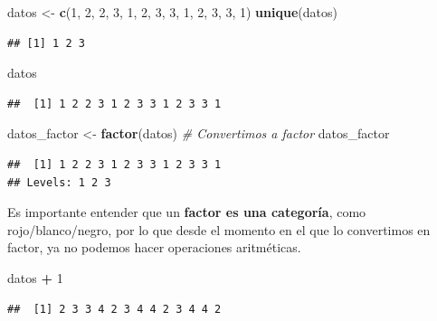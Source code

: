 \documentclass[11pt,]{book}
\newenvironment{Shaded}{\begin{snugshade}}{\end{snugshade}}
\newcommand{\CommentTok}[1]{\textcolor[rgb]{0.37,0.37,0.37}{\textit{#1}}}
\newcommand{\DecValTok}[1]{\textcolor[rgb]{0.06,0.06,0.06}{#1}}
\newcommand{\KeywordTok}[1]{\textcolor[rgb]{0.27,0.27,0.27}{\textbf{#1}}}
\newcommand{\NormalTok}[1]{#1}
\newcommand{\OperatorTok}[1]{\textcolor[rgb]{0.43,0.43,0.43}{\textbf{#1}}}
\newcommand{\StringTok}[1]{\textcolor[rgb]{0.5,0.5,0.5}{#1}}
\begin{document}
\begin{Shaded}
\begin{Highlighting}[]
\NormalTok{datos <-}\StringTok{ }\KeywordTok{c}\NormalTok{(}\DecValTok{1}\NormalTok{, }\DecValTok{2}\NormalTok{, }\DecValTok{2}\NormalTok{, }\DecValTok{3}\NormalTok{, }\DecValTok{1}\NormalTok{, }\DecValTok{2}\NormalTok{, }\DecValTok{3}\NormalTok{, }\DecValTok{3}\NormalTok{, }\DecValTok{1}\NormalTok{, }\DecValTok{2}\NormalTok{, }\DecValTok{3}\NormalTok{, }\DecValTok{3}\NormalTok{, }\DecValTok{1}\NormalTok{)}
\KeywordTok{unique}\NormalTok{(datos)}
\end{Highlighting}
\end{Shaded}

\begin{verbatim}
## [1] 1 2 3
\end{verbatim}

\begin{Shaded}
\begin{Highlighting}[]
\NormalTok{datos}
\end{Highlighting}
\end{Shaded}

\begin{verbatim}
##  [1] 1 2 2 3 1 2 3 3 1 2 3 3 1
\end{verbatim}

\begin{Shaded}
\begin{Highlighting}[]
\NormalTok{datos_factor <-}\StringTok{ }\KeywordTok{factor}\NormalTok{(datos) }\CommentTok{# Convertimos a factor}
\NormalTok{datos_factor }
\end{Highlighting}
\end{Shaded}

\begin{verbatim}
##  [1] 1 2 2 3 1 2 3 3 1 2 3 3 1
## Levels: 1 2 3
\end{verbatim}

Es importante entender que un \textbf{factor es una categoría}, como rojo/blanco/negro, por lo que desde el momento en el que lo convertimos en factor, ya no podemos hacer operaciones aritméticas.

\begin{Shaded}
\begin{Highlighting}[]
\NormalTok{datos }\OperatorTok{+}\StringTok{ }\DecValTok{1}
\end{Highlighting}
\end{Shaded}

\begin{verbatim}
##  [1] 2 3 3 4 2 3 4 4 2 3 4 4 2
\end{verbatim}
\end{document}
